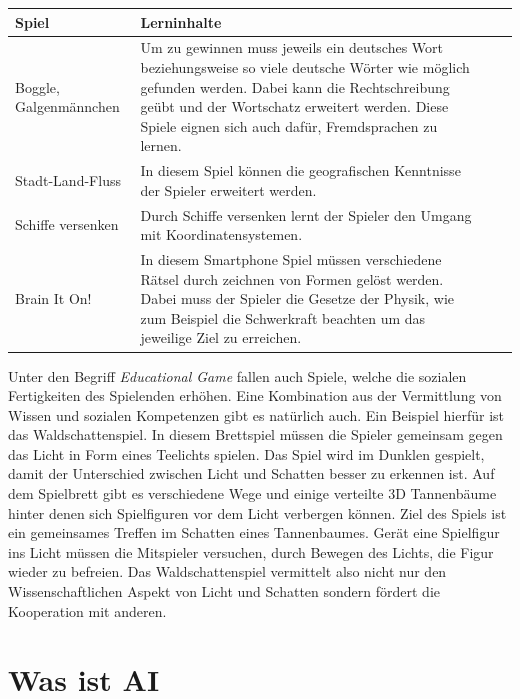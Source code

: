 \begin{center}
\label{tbl_educationalGames}
\begin{tabular}{ |p{3cm} | p{10cm}| c r }
\hline
Spiel & Lerninhalte \\
\hline
Boggle, Galgenmännchen & Um zu gewinnen muss jeweils ein deutsches Wort beziehungsweise so viele deutsche Wörter wie möglich gefunden werden. Dabei kann die Rechtschreibung geübt und der Wortschatz erweitert werden. Diese Spiele eignen sich auch dafür, Fremdsprachen zu lernen. \\  
\hline
Stadt-Land-Fluss & In diesem Spiel können die geografischen Kenntnisse der Spieler erweitert werden. \\
\hline
Schiffe versenken & Durch Schiffe versenken lernt der Spieler den Umgang mit Koordinatensystemen.   \\ 
\hline
Brain It On! & In diesem Smartphone Spiel müssen verschiedene Rätsel durch zeichnen von Formen gelöst werden. Dabei muss der Spieler die Gesetze der Physik, wie zum Beispiel die Schwerkraft beachten um das jeweilige Ziel zu erreichen. \\ 
\hline
\end{tabular} 
\end{center} 

Unter den Begriff \textit{Educational Game} fallen auch Spiele, welche die sozialen Fertigkeiten des Spielenden erhöhen. Eine Kombination aus der Vermittlung von Wissen und sozialen Kompetenzen gibt es natürlich auch. Ein Beispiel hierfür ist das Waldschattenspiel. In diesem Brettspiel müssen die Spieler gemeinsam gegen das Licht in Form eines Teelichts spielen. Das Spiel wird im Dunklen gespielt, damit der Unterschied zwischen Licht und Schatten besser zu erkennen ist. Auf dem Spielbrett gibt es verschiedene Wege und einige verteilte 3D Tannenbäume hinter denen sich Spielfiguren vor dem Licht verbergen können. Ziel des Spiels ist ein gemeinsames Treffen im Schatten eines Tannenbaumes. Gerät eine Spielfigur ins Licht müssen die Mitspieler versuchen, durch Bewegen des Lichts, die Figur wieder zu befreien. Das Waldschattenspiel vermittelt also nicht nur den Wissenschaftlichen Aspekt von Licht und Schatten sondern fördert die Kooperation mit anderen. \cite{F_Lernspiel_3.2}

\section{Was ist AI}

